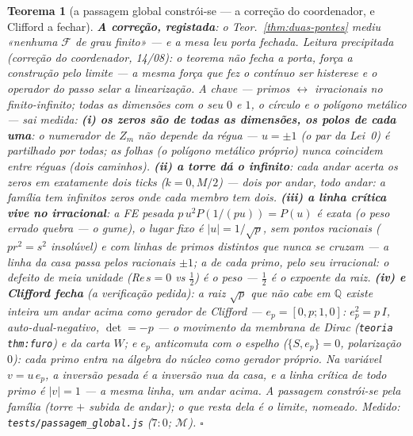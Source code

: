 \documentclass[11pt,a4paper]{article}
\newtheorem{teorema}{Teorema}
\newcommand{\code}[1]{\texttt{\small #1}}
\newcommand{\leitura}[1]{\code{#1}}
\begin{document}
\begin{teorema}[a passagem global constrói-se --- a correção do
coordenador, e Clifford a fechar]\label{thm:passagem-global}
\textbf{A correção, registada}: o Teor.~\ref{thm:duas-pontes} mediu
«nenhuma $\mathcal{F}$ \emph{de grau finito}» --- e a mesa leu porta
fechada. Leitura precipitada (correção do coordenador, 14/08): o
teorema não fecha a porta, \emph{força a construção pelo limite} ---
a mesma força que fez o contínuo ser histerese e o operador do passo selar a
linearização. A chave --- \emph{primos $\leftrightarrow$ irracionais
no finito-infinito; todas as dimensões com o seu $0$ e $1$, o círculo
e o polígono metálico} --- sai medida:
\textbf{(i) os zeros são de todas as dimensões, os polos de cada
uma}: o numerador de $Z_{m}$ não depende da régua --- $u=\pm1$ (o par
da Lei~0) é partilhado por todas; as folhas (o polígono metálico
próprio) nunca coincidem entre réguas (dois caminhos).
\textbf{(ii) a torre dá o infinito}: cada andar acerta os zeros em
exatamente \emph{dois} ticks ($k=0,M/2$) --- dois por andar, todo
andar: a família tem infinitos zeros onde cada membro tem dois.
\textbf{(iii) a linha crítica vive no irracional}: a FE \emph{pesada}
$p\,u^{2}P(1/(pu))=P(u)$ é exata (o peso errado quebra --- o gume), o
lugar fixo é $|u|=1/\sqrt{p}$, \emph{sem pontos racionais}
($p r^{2}=s^{2}$ insolúvel) e com linhas de primos distintos que
nunca se cruzam --- a linha da casa passa pelos racionais $\pm1$; a
de cada primo, pelo seu irracional: \emph{o defeito de meia unidade
(Re$\,s=0$ vs $\tfrac12$) é o peso --- $\tfrac12$ é o expoente da
raiz}.
\textbf{(iv) e Clifford fecha} (a verificação pedida): a raiz
$\sqrt{p}$ que não cabe em $\mathbb{Q}$ existe \emph{inteira um andar
acima} como gerador de Clifford --- $e_{p}=[0,p;1,0]$:
$e_{p}^{2}=p\,I$, auto-dual-negativo, $\det=-p$ --- o movimento da
membrana de Dirac (\leitura{teoria thm:furo}) e da carta $W$; e $e_{p}$
\emph{anticomuta com o espelho} ($\{S,e_{p}\}=0$, polarização $0$):
cada primo entra na álgebra do núcleo como gerador próprio. Na
variável $v=u\,e_{p}$, a inversão pesada é a inversão \emph{nua} da
casa, e a linha crítica de todo primo é $|v|=1$ --- \emph{a mesma
linha, um andar acima}. A passagem constrói-se pela família
(torre $+$ subida de andar); o que resta dela é o limite, nomeado.
\emph{Medido:} \code{tests/passagem\_global.js} ($7{:}0$;
$\mathcal{M}$).
$\square$
\end{teorema}
\end{document}
